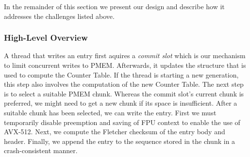 \documentclass[12pt,a4paper,twoside]{book}
\begin{document}

In the remainder of this section we present our design and describe how it addresses the challenges listed above.

\subsubsection{High-Level Overview}\label{di:prb:write:controlflow}
A thread that writes an entry first aquires a \textit{commit slot} which is our mechanism to limit concurrent writes to PMEM.
Afterwards, it updates the structure that is used to compute the Counter Table.
If the thread is starting a new generation, this step also involves the computation of the new Counter Table.
The next step is to select a suitable PMEM chunk. Whereas the commit slot's current chunk is preferred, we might need to get a new chunk if its space is insufficient.
After a suitable chunk has been selected, we can write the entry.
First we must temporarily disable preemption and saving of FPU context to enable the use of AVX-512.
Next, we compute the Fletcher checksum of the entry body and header.
Finally, we append the entry to the sequence stored in the chunk in a crash-consistent manner.
\end{document}
